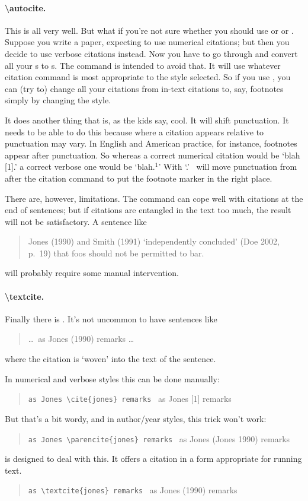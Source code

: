 \paragraph{\textbackslash autocite.} This is all very well. But what
if you’re not sure whether you should use  or 
or . Suppose you write a paper, expecting to use
numerical citations; but then you decide to use verbose citations
instead. Now you have to go through and convert all your s to
s. The  command is intended to avoid
that. It will use whatever citation command is most appropriate to the
style selected. So if you use , you can (try to) change
all your citations from in-text citations to, say, footnotes simply by
changing the style.

It does another thing that is, as the kids say, cool. It will shift
punctuation. It needs to be able to do this because where a citation
appears relative to punctuation may vary. In English and American
practice, for instance, footnotes appear after punctuation. So whereas
a correct numerical citation would be `blah [1].' a correct verbose one
would be `blah.$^1$' With `.' \biblatex\ will move
punctuation from after the citation command to put the footnote marker
in the right place.

There are, however, limitations. The  command can cope
well with citations at the end of sentences; but if citations are
entangled in the text too much, the result will not be satisfactory. A
sentence like
\begin{quote}
  Jones (1990) and Smith (1991) `independently concluded' (Doe 2002,
  p.~19) that foos should not be permitted to bar.
\end{quote}
will probably require some manual intervention.

\paragraph{\textbackslash textcite.} Finally there is
. It’s not uncommon to have sentences like
\begin{quote}
   \ldots\ as Jones (1990) remarks \ldots
\end{quote}
where the citation is `woven' into the text of the sentence.

In numerical and verbose styles this can be done manually:
\begin{quote}
   \verb|as Jones \cite{jones} remarks| \gives\ as Jones [1] remarks
\end{quote}
But that's a bit wordy, and in author/year styles, this trick won't work:
\begin{quote}
   \verb|as Jones \parencite{jones} remarks| \gives\ as Jones (Jones 1990) remarks
\end{quote}
 is designed to deal with this. It offers a citation in a form appropriate for running text.
\begin{quote}
   \verb|as \textcite{jones} remarks| \gives\ as Jones (1990) remarks
\end{quote}

